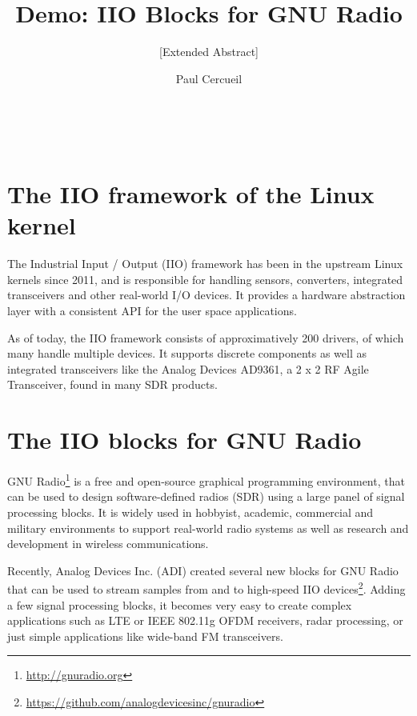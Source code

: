 \documentclass{acm_proc_article-sp}
\begin{document}
\title{Demo: IIO Blocks for GNU Radio}
\subtitle{[Extended Abstract]}


\author{
\alignauthor
Paul Cercueil\\
	\\
	\\
	\\
}

\maketitle


\section{The IIO framework of the Linux kernel}

The Industrial Input / Output (IIO) framework has been in
the upstream Linux kernels since 2011, and is responsible for handling sensors,
converters, integrated transceivers and other real-world I/O devices. It provides
a hardware abstraction layer with a consistent API for the user space
applications.

As of today, the IIO framework consists of approximatively 200 drivers,
of which many handle multiple devices.
It supports discrete components as well as
integrated transceivers like the Analog Devices AD9361, a 2 x 2 RF Agile Transceiver, found in many SDR products.

\section{The IIO blocks for GNU Radio}

GNU Radio\footnote{\url{http://gnuradio.org}}
is a free and open-source graphical programming environment, that can
be used to design software-defined radios (SDR) using a large panel of signal
processing blocks. It is widely used in hobbyist, academic, commercial and
military environments to support real-world radio systems as well as research
and development in wireless communications.

Recently, Analog Devices Inc. (ADI) created several new blocks for GNU Radio
that can be used to stream samples from and to high-speed IIO
devices\footnote{\url{https://github.com/analogdevicesinc/gnuradio}}.
Adding a few signal processing
blocks, it becomes very easy to create complex applications such as
LTE or IEEE 802.11g OFDM receivers, radar processing, or just simple
applications like wide-band FM transceivers.
\end{document}
